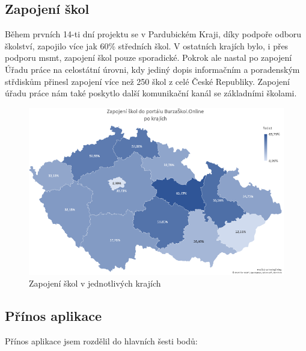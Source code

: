 \subsection{Zapojení škol}

Během prvních 14-ti dní projektu se v Pardubickém Kraji, díky podpoře odboru školství, zapojilo více jak 60\% středních škol.
V ostatních krajích bylo, i přes podporu \acrshort{msmt}, zapojení škol pouze sporadické.
Pokrok ale nastal po zapojení Úřadu práce na celostátní úrovni, kdy jediný dopis informačním a poradenským střdiskům přinesl zapojení více než 250 škol z celé České Republiky.
Zapojení úřadu práce nám také poskytlo další komunikační kanál se základními školami.

\begin{figure}[h]
\centering
\includegraphics[width=\textwidth]{img/kraje-zapojeni.png}
\caption{Zapojení škol v jednotlivých krajích}\label{fig:kraje-zapojeni}
\end{figure}

\subsection{Přínos aplikace}

Přínos aplikace jsem rozdělil do hlavních šesti bodů:


